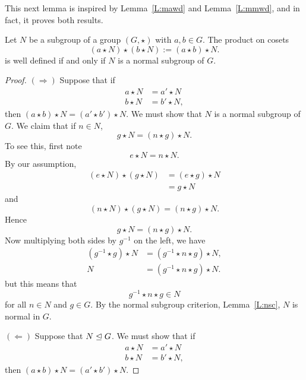 \documentclass{ximera}
\begin{document}
This next lemma is inspired by Lemma~\ref{L:mawd} and
Lemma~\ref{L:mmwd}, and in fact, it proves both results.

\begin{lemma}
  Let $N$ be a subgroup of a group $(G,\star)$ with $a,b\in G$.  The
  product on cosets
  \[
  (a\star N) \star (b\star N ) := (a\star b)\star N.
  \]
  is well defined if and only if $N$ is a normal subgroup of $G$.
  \begin{proof}
        $(\Rightarrow)$ Suppose that if
    \begin{align*}
      a\star N &= a'\star N\\
      b\star N &= b'\star N,
    \end{align*}
    then $(a\star b) \star N = (a'\star b')\star N$. We must show that
    $N$ is a normal subgroup of $G$. We claim that if $n\in N$,
    \[
    g \star N = (n\star g)\star N.
    \]
    To see this, first note
    \[
    e \star N = n \star N.
    \]
    By our assumption,
    \begin{align*}
    (e\star N) \star (g\star N) &= (e\star g)\star N \\
    &= g\star N
    \end{align*}
    and
    \[
    (n\star N) \star (g\star N) = (n\star g)\star N.
    \]
    Hence
    \[
    g\star N = (n\star g)\star N.
    \]
    Now multiplying both sides by $g^{-1}$ on the left, we have
    \begin{align*}
      (g^{-1}\star g)\star N &= (g^{-1} \star n\star g)\star N,\\
      N &= (g^{-1} \star n\star g)\star N.
    \end{align*}
    but this means that
    \[
    g^{-1} \star n\star g \in N
    \]
    for all $n\in N$ and $g\in G$. By the normal subgroup criterion,
    Lemma~\ref{L:nsc}, $N$ is normal in $G$.

    
    $(\Leftarrow)$ Suppose that $N\trianglelefteq G$. We must show that if
    \begin{align*}
      a\star N &= a'\star N\\
      b\star N &= b'\star N,
    \end{align*}
    then $(a\star b) \star N = (a'\star b')\star N$.



\end{proof}
\end{lemma}
\end{document}
